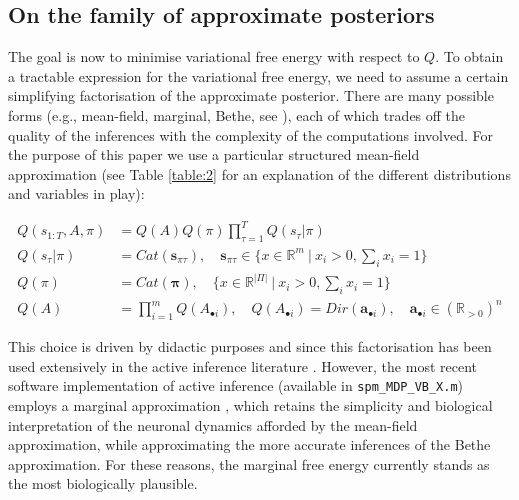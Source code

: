 \documentclass[review,12pt,authoryear]{elsarticle}
\begin{document}
\begin{figure}
    \label{fig: VFE interpretations}
\end{figure}


\subsection{On the family of approximate posteriors}

The goal is now to minimise variational free energy with respect to $Q$. To obtain a tractable expression for the variational free energy, we need to assume a certain simplifying factorisation of the approximate posterior. There are many possible forms (e.g., mean-field, marginal, Bethe, see \citep{parrNeuronalMessagePassing2019,yedidiaConstructingFreeEnergyApproximations2005,heskesConvexityArgumentsEfficient2006}), each of which trades off the quality of the inferences with the complexity of the computations involved. For the purpose of this paper we use a particular structured mean-field approximation (see Table \ref{table:2} for an explanation of the different distributions and variables in play):
  		
  		\begin{align}
  		\label{eq: mean field approx}
  		  	Q(s_{1:T},A,\pi) &= Q(A)Q(\pi) \prod_{\tau =1}^T Q(s_\tau|\pi) \\
  		  	Q(s_\tau|\pi)&= Cat(\mathbf s_{\pi \tau}), \quad \mathbf s_{\pi \tau} \in  \{x \in \mathbb R^{m} \:|\: x_i >0, \sum_i x_i =1\} \nonumber \\
  		  	Q(\pi) &= Cat(\pmb \pi), \quad \{x \in \mathbb R^{|\Pi|} \:|\: x_i >0, \sum_i x_i =1\} \nonumber \\
  		  	Q(A)&= \prod_{i=1}^m Q(A_{\bullet i}) , \quad Q(A_{\bullet i})= Dir(\mathbf a_{\bullet i}), \quad \mathbf a_{\bullet i} \in (\mathbb R_{>0})^n \nonumber
  		\end{align}
  		
This choice is driven by didactic purposes and since this factorisation has been used extensively in the active inference literature \citep{fristonDeepTemporalModels2018,fristonGraphicalBrainBelief2017,fristonActiveInferenceProcess2017}. However, the most recent software implementation of active inference (available in \texttt{spm\_MDP\_VB\_X.m}) employs a marginal approximation \citep{parrNeuronalMessagePassing2019,parrComputationalNeurologyActive2019}, which retains the simplicity and biological interpretation of the neuronal dynamics afforded by the mean-field approximation, while approximating the more accurate inferences of the Bethe approximation. For these reasons, the marginal free energy currently stands as the most biologically plausible.
\end{document}
